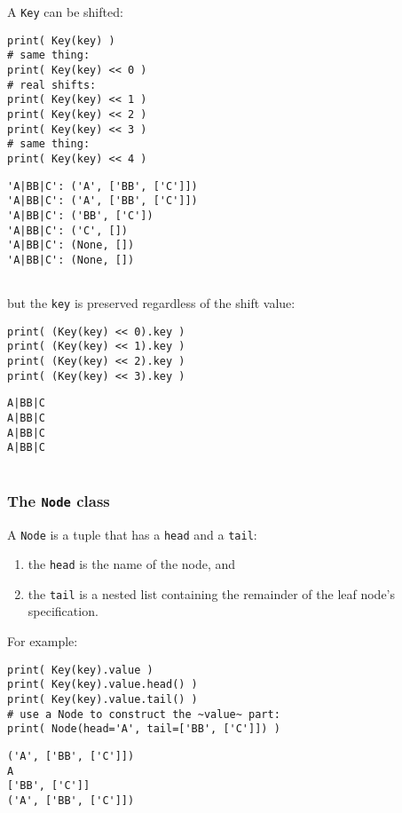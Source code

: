 \documentclass[10pt]{amsart}
\numberwithin{equation}{section}
\begin{document}
A \texttt{Key} can be shifted:
\begin{verbatim}
print( Key(key) )
# same thing:
print( Key(key) << 0 )
# real shifts:
print( Key(key) << 1 )
print( Key(key) << 2 )
print( Key(key) << 3 )
# same thing:
print( Key(key) << 4 )
\end{verbatim}

\begin{verbatim}
'A|BB|C': ('A', ['BB', ['C']])
'A|BB|C': ('A', ['BB', ['C']])
'A|BB|C': ('BB', ['C'])
'A|BB|C': ('C', [])
'A|BB|C': (None, [])
'A|BB|C': (None, [])


\end{verbatim}


but the \texttt{key} is preserved regardless of the shift value:
\begin{verbatim}
print( (Key(key) << 0).key )
print( (Key(key) << 1).key )
print( (Key(key) << 2).key )
print( (Key(key) << 3).key )
\end{verbatim}

\begin{verbatim}
A|BB|C
A|BB|C
A|BB|C
A|BB|C


\end{verbatim}

\subsubsection{The \texttt{Node} class}
\label{sec:org240595d}
A \texttt{Node} is a tuple that has a \texttt{head} and a \texttt{tail}: 

\begin{enumerate}
\item the \texttt{head} is the name of the node, and
\item the \texttt{tail} is a nested list containing the remainder of the leaf node's
specification.
\end{enumerate}

For example:
\begin{verbatim}
print( Key(key).value )
print( Key(key).value.head() )
print( Key(key).value.tail() )
# use a Node to construct the ~value~ part: 
print( Node(head='A', tail=['BB', ['C']]) )
\end{verbatim}

\begin{verbatim}
('A', ['BB', ['C']])
A
['BB', ['C']]
('A', ['BB', ['C']])


\end{verbatim}
\end{document}
